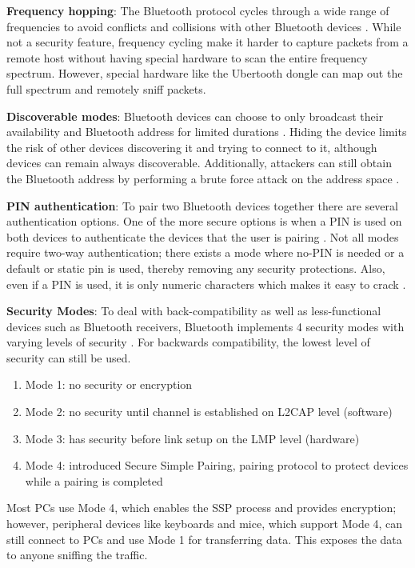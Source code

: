 \documentclass{acm_proc_article-sp}
\begin{document}
\textbf{Frequency hopping}: The Bluetooth protocol cycles through a wide range of frequencies to avoid conflicts and collisions with other Bluetooth devices \cite{ma2007keystroke}. While not a security feature, frequency cycling make it harder to capture packets from a remote host without having special hardware to scan the entire frequency spectrum. However, special hardware like the Ubertooth dongle can map out the full spectrum and remotely sniff packets.

\textbf{Discoverable modes}: Bluetooth devices can choose to only broadcast their availability and Bluetooth address for limited durations \cite{ma2007keystroke}. Hiding the device limits the risk of other devices discovering it and trying to connect to it, although devices can remain always discoverable. Additionally, attackers can still obtain the Bluetooth address by performing a brute force attack on the address space \cite{ma2007keystroke}.

\textbf{PIN authentication}: To pair two Bluetooth devices together there are several authentication options. One of the more secure options is when a PIN is used on both devices to authenticate the devices that the user is pairing \cite{ma2007keystroke}. Not all modes require two-way authentication; there exists a mode where no-PIN is needed or a default or static pin is used, thereby removing any security protections. Also, even if a PIN is used, it is only numeric characters which makes it easy to crack \cite{ma2007keystroke,shaked2005cracking,lindell2008attacks}.

\textbf{Security Modes}: To deal with back-compatibility as well as less-functional devices such as Bluetooth receivers, Bluetooth implements 4 security modes with varying levels of security \cite{ma2007keystroke}. For backwards compatibility, the lowest level of security can still be used.
\begin{enumerate}
\item Mode 1: no security or encryption
\item Mode 2: no security until channel is established on L2CAP level (software)
\item Mode 3: has security before link setup on the LMP level (hardware)
\item Mode 4: introduced Secure Simple Pairing, pairing protocol to protect devices while a pairing is completed
\end{enumerate}

Most PCs use Mode 4, which enables the SSP process and provides encryption; however, peripheral devices like keyboards and mice, which support Mode 4, can still connect to PCs and use Mode 1 for transferring data. This exposes the data to anyone sniffing the traffic. 
\end{document}
